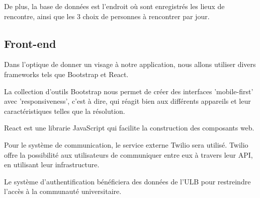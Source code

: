 \documentclass[10pt]{article}
\begin{document}
   De plus, la base de données est l'endroit où sont enregistrés les lieux de rencontre, ainsi que les 3 choix de personnes à rencontrer par jour.
   
  \subsection{Front-end}
   Dans l'optique de donner un visage à notre application, nous allons utiliser divers frameworks tels que Bootstrap et React.

   La collection d'outils Bootstrap nous permet de créer des interfaces 'mobile-first' avec 'responsiveness', c'est à dire, qui réagit bien
   aux différents appareils et leur caractéristiques telles que la résolution.

   React est une librarie JavaScript qui facilite la construction des composants web.

   Pour le système de communication, le service externe Twilio sera utilisé. Twilio offre la possibilité aux utilisateurs de communiquer
   entre eux à travers leur API, en utilisant leur infrastructure.

   Le système d'authentification bénéficiera des données de l'ULB pour restreindre l'accès à la communauté universitaire. 
\end{document}
